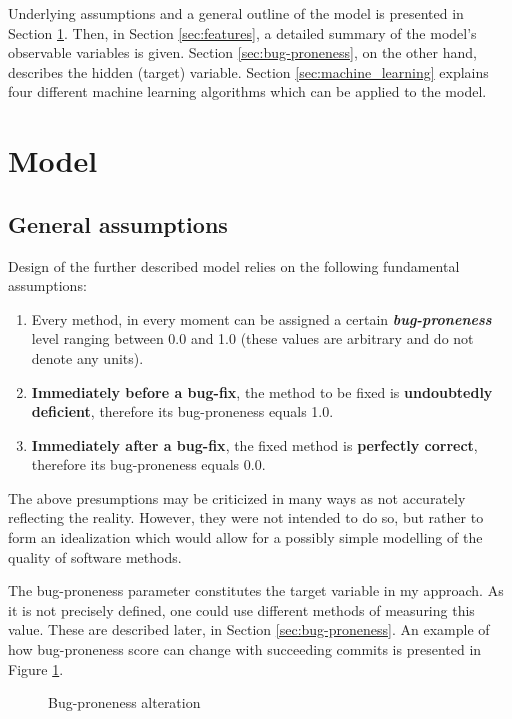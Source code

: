 \documentclass{pracamgr}
\begin{document}
Underlying assumptions and a general outline of the model is presented in Section \ref{sec:model}. Then, in Section \ref{sec:features}, a detailed summary of the model's observable variables is given. Section \ref{sec:bug-proneness}, on the other hand, describes the hidden (target) variable. Section \ref{sec:machine_learning} explains four different machine learning algorithms which can be applied to the model.

\section{Model}
\label{sec:model}

\subsection{General assumptions}
\label{sec:general_assumptions}
Design of the further described model relies on the following fundamental assumptions:
\begin{enumerate}[label=(A\arabic*)]
	\item Every method, in every moment can be assigned a certain \textbf{\emph{bug-proneness}} level ranging between 0.0 and 1.0 (these values are arbitrary and do not denote any units).
	\item \textbf{Immediately before a bug-fix}, the method to be fixed is \textbf{undoubtedly deficient}, therefore its bug-proneness equals 1.0.
	\item \textbf{Immediately after a bug-fix}, the fixed method is \textbf{perfectly correct}, therefore its bug-proneness equals 0.0. 
\end{enumerate}
The above presumptions may be criticized in many ways as not accurately reflecting the reality. However, they were not intended to do so, but rather to form an idealization which would allow for a possibly simple modelling of the quality of software methods.

The bug-proneness parameter constitutes the target variable in my approach. As it is not precisely defined, one could use different methods of measuring this value. These are described later, in Section \ref{sec:bug-proneness}. An example of how bug-proneness score can change with succeeding commits is presented in Figure \ref{fig:bug_proneness}.

\begin{figure}[h]
\centering

\caption{Bug-proneness alteration}
\label{fig:bug_proneness}
\end{figure}
\end{document}
